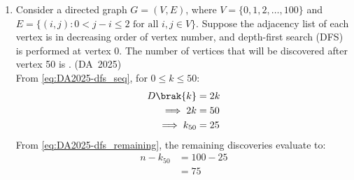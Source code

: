 \begin{enumerate}[label=\thesubsection.\arabic*, ref=\thesubsection.\theenumi]
\begin{itemize}
	\item Popping Phase ($\text{flag} = 1$):
	Because braces $\{\}$ are not used after \texttt{if (x is odd):}, standard pseudocode scoping rules apply the condition solely to the single next statement \texttt{Pop(S)}. The statement \texttt{Set sum = sum + x} belongs to the outer \texttt{if (flag equals 1)} block and executes on every pop iteration:
	\begin{enumerate}
		\item Pop $x = 8$ (even): no extra pop occurs $\implies \text{sum} = 0 + 8 = 8$.
		\item Pop $x = 7$ (odd): additionally pops $6 \implies \text{sum} = 8 + 7 = 15$.
		\item Pop $x = 5$ (odd): additionally pops $4 \implies \text{sum} = 15 + 5 = 20$.
		\item Pop $x = 3$ (odd): additionally pops $2 \implies \text{sum} = 20 + 3 = 23$.
		\item Pop $x = 1$ (odd): additionally pops $0 \implies \text{sum} = 23 + 1 = 24$.
	\end{enumerate}
\end{itemize}
The stack is now empty, terminating the loop.
\begin{align}
	\text{sum} = 24
\end{align}
The following code verifies the solution
\begin{lstlisting}[frame=single, basicstyle=\rmfamily, escapeinside={(*@}{@*)}]
(*@\makebox[\dimexpr\linewidth-2\fboxsep-2\fboxrule\relax][c]{codes/q42/q42.py}@*)
\end{lstlisting}
	\item 
	Consider a directed graph $G = (V, E)$, where $V = \{0, 1, 2, \dots, 100\}$ and $E = \{(i, j) : 0 < j - i \le 2 \text{ for all } i, j \in V\}$. Suppose the adjacency list of each vertex is in decreasing order of vertex number, and depth-first search (DFS) is performed at vertex 0. The number of vertices that will be discovered after vertex 50 is \underline{\hspace{1.5cm}}.
	\hfill (DA~2025)
	\\
	\solution
	From \eqref{eq:DA2025-dfs_seq}, for $0 \le k \le 50$:
	\begin{align}
		D\brak{k} &= 2k
		\\
		\implies 2k &= 50
		\\
		\implies k_{50} &= 25
	\end{align}
	From \eqref{eq:DA2025-dfs_remaining}, the remaining discoveries evaluate to:
	\begin{align}
		n - k_{50} &= 100 - 25
		\\
		&= 75
	\end{align}
	
\end{enumerate}